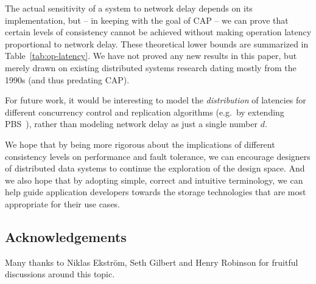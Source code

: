 \documentclass[a4paper,twocolumn,10pt]{article}
\begin{document}
The actual sensitivity of a system to network delay depends on its implementation, but -- in keeping
with the goal of CAP -- we can prove that certain levels of consistency cannot be achieved without
making operation latency proportional to network delay. These theoretical lower bounds are
summarized in Table~\ref{tab:op-latency}. We have not proved any new results in this paper, but
merely drawn on existing distributed systems research dating mostly from the 1990s (and thus
predating CAP).

For future work, it would be interesting to model the \emph{distribution} of latencies for different
concurrency control and replication algorithms (e.g.\ by extending PBS~\cite{Bailis2012to}), rather
than modeling network delay as just a single number $d$.

We hope that by being more rigorous about the implications of different consistency levels on
performance and fault tolerance, we can encourage designers of distributed data systems to continue
the exploration of the design space. And we also hope that by adopting simple, correct and intuitive
terminology, we can help guide application developers towards the storage technologies that are most
appropriate for their use cases.

\subsection*{Acknowledgements}

Many thanks to Niklas Ekström, Seth Gilbert and Henry Robinson for fruitful discussions around this topic.

{\footnotesize

{}}
\end{document}
